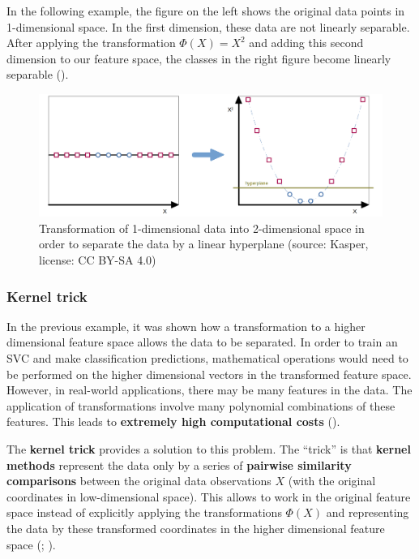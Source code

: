 \documentclass [oneside,10pt,a4paper,ngerman,BCOR10mm,headsepline,parindent,final]{scrartcl}
\begin{document}
In the following example, the figure on the left shows the original data
points in 1-dimensional space. In the first dimension, these data are
not linearly separable. After applying the transformation
\(\Phi(X) = X^2\) and adding this second dimension to our feature space,
the classes in the right figure become linearly separable
(\cite{Kernel_trick_2018}).

    \begin{figure}
\centering
\includegraphics{images/SVC_transformation.png}
\caption{Transformation of 1-dimensional data into 2-dimensional space
in order to separate the data by a linear hyperplane (source: Kasper,
license: CC BY-SA 4.0)}
\end{figure}

    \hypertarget{kernel-trick}{%
\subsubsection{Kernel trick}\label{kernel-trick}}

In the previous example, it was shown how a transformation to a higher
dimensional feature space allows the data to be separated. In order to
train an SVC and make classification predictions, mathematical
operations would need to be performed on the higher dimensional vectors
in the transformed feature space. However, in real-world applications,
there may be many features in the data. The application of
transformations involve many polynomial combinations of these features.
This leads to \textbf{extremely high computational costs}
(\cite{Kernel_trick_2018}).

The \textbf{kernel trick} provides a solution to this problem. The
``trick'' is that \textbf{kernel methods} represent the data only by a
series of \textbf{pairwise similarity comparisons} between the original
data observations \(X\) (with the original coordinates in
low-dimensional space). This allows to work in the original feature
space instead of explicitly applying the transformations \(\Phi(X)\) and
representing the data by these transformed coordinates in the higher
dimensional feature space (\cite{Kernel_trick_2018};
\cite{Kernel_trick_2018_2}).
\end{document}

